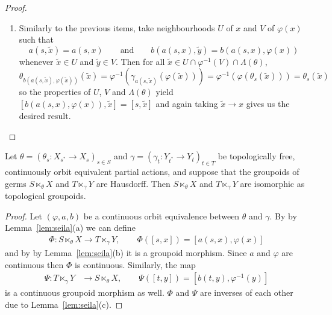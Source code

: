 \begin{proof}
\begin{enumerate}
\item[(c)] Similarly to the previous items, take neighbourhoods $U$ of $x$ and $V$ of $\varphi(x)$ such that
\[a(s,\widetilde{x})=a(s,x)\qquad\text{and}\qquad b(a(s,x),\widetilde{y})=b(a(s,x),\varphi(x))\]
whenever $\widetilde{x}\in U$ and $\widetilde{y}\in V$. Then for all $\widetilde{x}\in U\cap\varphi^{-1}(V)\cap \Lambda(\theta)$,
\[\theta_{b(a(s,\widetilde{x}),\varphi(\widetilde{x}))}(\widetilde{x})=\varphi^{-1}(\gamma_{a(s,\widetilde{x})}(\varphi(\widetilde{x})))=\varphi^{-1}(\varphi(\theta_s(\widetilde{x})))=\theta_s(\widetilde{x})\]
so the properties of $U$, $V$ and $\Lambda(\theta)$ yield $[b(a(s,x),\varphi(x)),\widetilde{x}]=[s,\widetilde{x}]$ and again taking $\widetilde{x}\to x$ gives us the desired result.\qedhere
\end{enumerate}
%
\end{proof}

\begin{theorem}\label{theo:coegroupoidgermiso}
Let $\theta=\left(\theta_s:X_{s^*}\to X_s\right)_{s\in S}$ and $\gamma=\left(\gamma_t:Y_{t^*}\to Y_t\right)_{t\in T}$ be topologically free, continuously orbit equivalent partial actions, and suppose that the groupoids of germs $S\ltimes_\theta X$ and $T\ltimes_\gamma Y$ are Hausdorff. Then $S \ltimes_\theta X$ and $T \ltimes_\gamma Y$ are isomorphic as topological groupoids.
\end{theorem}

\begin{proof}
Let $(\varphi,a,b)$ be a continuous orbit equivalence between $\theta$ and $\gamma$. By by Lemma~\ref{lem:seila}(a) we can define
\begin{align*}
\Phi:S \ltimes_\theta X  \longrightarrow T \ltimes_\gamma Y,\qquad \Phi([s,x])=[a(s,x), \varphi(x)]
\end{align*}
and by by Lemma~\ref{lem:seila}(b) it is a groupoid morphism. Since $a$ and $\varphi$ are continuous then $\Phi$ is continuous. Similarly, the map  
 \begin{align*}
\Psi:T \ltimes_\gamma Y & \longrightarrow S \ltimes_\theta X,\qquad\Psi([t,y])=[b(t,y), \varphi^{-1}(y)]
\end{align*}
is a continuous groupoid morphism as well. $\Phi$ and $\Psi$ are inverses of each other due to Lemma~\ref{lem:seila}(c).\qedhere
\end{proof}

